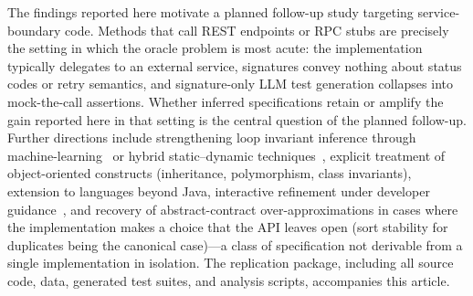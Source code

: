 The findings reported here motivate a planned follow-up study targeting service-boundary code. Methods that call REST endpoints or RPC stubs are precisely the setting in which the oracle problem is most acute: the implementation typically delegates to an external service, signatures convey nothing about status codes or retry semantics, and signature-only LLM test generation collapses into mock-the-call assertions. Whether inferred specifications retain or amplify the gain reported here in that setting is the central question of the planned follow-up. Further directions include strengthening loop invariant inference through machine-learning~\cite{wei2011inferring} or hybrid static--dynamic techniques~\cite{ernst2007daikon}, explicit treatment of object-oriented constructs (inheritance, polymorphism, class invariants), extension to languages beyond Java, interactive refinement under developer guidance~\cite{cousot2011contract}, and recovery of abstract-contract over-approximations in cases where the implementation makes a choice that the API leaves open (sort stability for duplicates being the canonical case)---a class of specification not derivable from a single implementation in isolation. The replication package, including all source code, data, generated test suites, and analysis scripts, accompanies this article.
